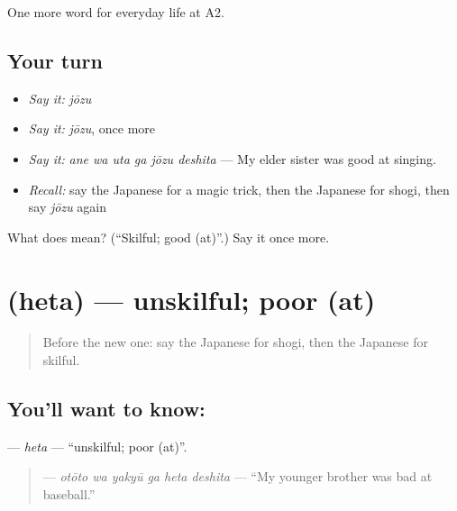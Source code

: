 \begin{grammarlens}[title={What you've built}]
One more word for everyday life at A2.
\end{grammarlens}

\subsection*{Your turn}
\begin{itemize}
\raggedright
  \item \emph{Say it:} \emph{jōzu}
  \item \emph{Say it:} \emph{jōzu}, once more
  \item \emph{Say it:} \emph{ane wa uta ga jōzu deshita} — My elder sister was good at singing.
  \item \emph{Recall:} say the Japanese for a magic trick, then the Japanese for shogi, then say \emph{jōzu} again
\end{itemize}

\begin{tcolorbox}[breakable,colback=teal!4,colframe=teal!35!black,title={Before you move on}]
What does  mean? (\textquotedblleft{}Skilful; good (at)\textquotedblright{}.) Say it once more.
\end{tcolorbox}
\section[\texorpdfstring{\ja{へた} (heta)}{へた (heta)}]{ (heta) — unskilful; poor (at)}

\label{lesson:JA-C240-heta}



\begin{quote}
Before the new one: say the Japanese for shogi, then the Japanese for skilful.
\end{quote}

\subsection*{You'll want to know: }
\textbf{} — \emph{heta} — \textquotedblleft{}unskilful; poor (at)\textquotedblright{}.

\begin{quote}
\textbf{  } — \emph{otōto wa yakyū ga heta deshita} — \textquotedblleft{}My younger brother was bad at baseball.\textquotedblright{}
\end{quote}

